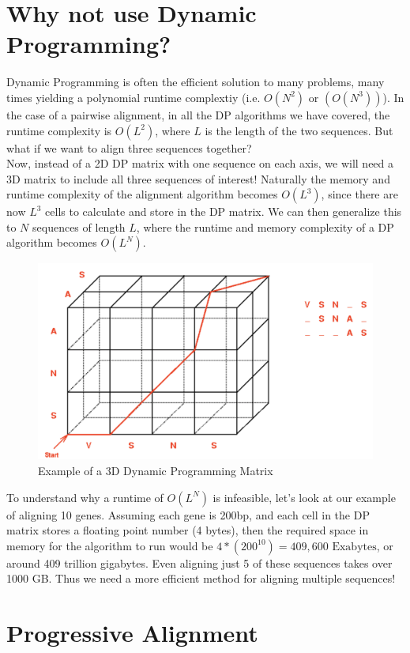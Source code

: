 \documentclass[12pt]{article}
\begin{document}
\section{Why not use Dynamic Programming?}
Dynamic Programming is often the efficient solution to many problems, many times yielding a polynomial runtime complextiy (i.e. $O(N^2)$ or $(O(N^3))$). In the case of a pairwise alignment, in all the DP algorithms we have covered, the runtime complexity is $O(L^2)$, where $L$ is the length of the two sequences. But what if we want to align three sequences together?\\[10pt]
Now, instead of a 2D DP matrix with one sequence on each axis, we will need a 3D matrix to include all three sequences of interest! Naturally the memory and runtime complexity of the alignment algorithm becomes $O(L^3)$, since there are now $L^3$ cells to calculate and store in the DP matrix. We can then generalize this to $N$ sequences of length $L$, where the runtime and memory complexity of a DP algorithm becomes $O(L^N)$.\\[10pt]
\begin{figure}[h]
    \centering
    \includegraphics[width = .6\linewidth]{3d_dp.png}
    \caption{Example of a 3D Dynamic Programming Matrix}
    \label{fig:3d_dp}
\end{figure}
To understand why a runtime of $O(L^N)$ is infeasible, let's look at our example of aligning 10 genes. Assuming each gene is 200bp, and each cell in the DP matrix stores a floating point number (4 bytes), then the required space in memory for the algorithm to run would be $4 * (200^10) = 409,600 \text{ Exabytes}$, or around 409 trillion gigabytes. Even aligning just 5 of these sequences takes over 1000 GB. Thus we need a more efficient method for aligning multiple sequences!

\section{Progressive Alignment}
\end{document}
